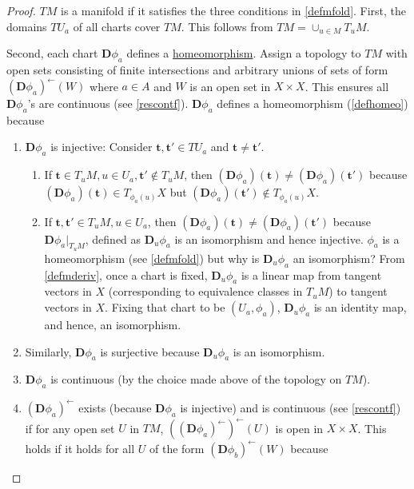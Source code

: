 \documentclass[letterpaper,12pt]{article}
\theoremstyle{plain}
\theoremstyle{plain}
\theoremstyle{definition}
\begin{document}
\begin{proof} $TM$ is a manifold if it satisfies the three conditions in \autoref{defmfold}. First, the domains $TU_a$ of all charts cover $TM$. This follows from $TM=\cup_{u\in M}T_uM$.

\noindent Second, each chart $\mathbf{D}\phi_a$ defines a \hyperref[defhomeo]{homeomorphism}. Assign a topology to $TM$ with open sets consisting of finite intersections and arbitrary unions of sets of form $(\mathbf{D}\phi_a)^{\leftarrow}(W)$ where $a\in A$ and $W$ is an open set in $X \times X$. This ensures all $\mathbf{D}\phi_a$'s are continuous (see \autoref{rescontf}). $\mathbf{D}\phi_a$ defines a homeomorphism (\autoref{defhomeo}) because
\begin{enumerate}
\item $\mathbf{D}\phi_a$ is injective: Consider $\mathbf{t},\mathbf{t}'\in TU_a$ and $\mathbf{t}\neq \mathbf{t}'$.
\begin{enumerate}
\item  If $\mathbf{t}\in T_uM,u\in U_a,\mathbf{t}'\notin T_uM$, then $(\mathbf{D}\phi_a)(\mathbf{t}) \neq (\mathbf{D}\phi_a)(\mathbf{t}')$ because $(\mathbf{D}\phi_a)(\mathbf{t})\in T_{\phi_a(u)}X$ but $(\mathbf{D}\phi_a)(\mathbf{t}')\notin T_{\phi_a(u)}X$.
\item If $\mathbf{t},\mathbf{t}'\in T_uM,u\in U_a$, then $(\mathbf{D}\phi_a)(\mathbf{t}) \neq (\mathbf{D}\phi_a)(\mathbf{t}')$ because $\mathbf{D}\phi_a|_{T_uM}$, defined as $\mathbf{D}_u\phi_a$ is an isomorphism and hence injective. $\phi_a$ is a homeomorphism (see \autoref{defmfold}) but why is $\mathbf{D}_u\phi_a$ an isomorphism? From \autoref{defmderiv}, once a chart is fixed, $\mathbf{D}_u\phi_a$ is a linear map from tangent vectors in $X$ (corresponding to equivalence classes in $T_uM$) to tangent vectors in $X$. Fixing that chart to be $(U_a,\phi_a)$, $\mathbf{D}_u\phi_a$ is an identity map, and hence, an isomorphism.
\end{enumerate}
\item Similarly, $\mathbf{D}\phi_a$ is surjective because $\mathbf{D}_u\phi_a$ is an isomorphism.
\item $\mathbf{D}\phi_a$ is continuous (by the choice made above of the topology on $TM$).
\item $(\mathbf{D}\phi_a)^{\leftarrow}$ exists (because $\mathbf{D}\phi_a$ is injective) and is continuous (see \autoref{rescontf}) if for any open set $U$ in $TM$, $\left(\left(\mathbf{D}\phi_a\right)^{\leftarrow}\right)^{\leftarrow}(U)$ is open in $X\times X$. This holds if it holds for all $U$ of the form $(\mathbf{D}\phi_b)^{\leftarrow}(W)$ because 

\end{enumerate}
\end{proof}
\end{document}
